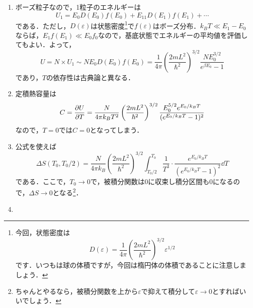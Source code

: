\documentclass[a4paper,pdflatex,ja=standard]{bxjsarticle}
\begin{document}
\begin{enumerate}
\begin{enumerate}
    \item 

    ボーズ粒子なので，1粒子のエネルギーは
    \begin{equation}
      U_1
      =
      E_0 D(E_0)f(E_0)
      +
      E_11 D(E_1)f(E_1)
      +
      \cdots
    \end{equation}
    である．ただし，$D(\varepsilon)$は状態密度\footnote{
      今回，状態密度は
      $$
        D(\varepsilon)
        =
        \frac{1}{4\pi}
        \left(  
          \frac{2mL^2}{\hbar^2}
        \right)^{3/2}
        \varepsilon^{1/2}
      $$
      です．いつもは球の体積ですが，今回は楕円体の体積であることに注意しましょう．
    }で$f(\varepsilon)$はボーズ分布．$k_BT\ll E_1-E_0$ならば，$E_1 f(E_1)\ll E_0 f_0$なので，基底状態でエネルギーの平均値を評価してもよい．よって，
    \begin{equation}
      U
      =
      N \times U_1
      \sim
      N E_0 D(E_0)f(E_0)
      =
      \frac{1}{4\pi}
      \left(  
        \frac{2mL^2}{\hbar^2}
      \right)^{3/2}
      \frac{NE_0^{3/2}}{e^{\beta E_0}-1}
    \end{equation}
    であり，$T$の依存性は古典論と異なる．

    \item 

    定積熱容量は
    \begin{equation}
      C
      =
      \pdv{U}{T}
      =
      \frac{N}{4\pi k_BT^2}
      \left(  
        \frac{2mL^2}{\hbar^2}
      \right)^{3/2}
      \frac{E_0^{5/2}e^{E_0/k_BT}}{(e^{E_0/k_BT}-1)^2}
    \end{equation}
    なので，$T=0$では$C=0$となってしまう．

    \item 
    
    公式を使えば
    \begin{equation}
      \Delta S(T_0, T_0/2)
      =
      \frac{N}{4\pi k_B}
      \left(  
        \frac{2mL^2}{\hbar^2}
      \right)^{3/2}
      \int_{T_0/2}^{T_0}
      \frac{1}{T^3}\cdot\frac{e^{E_0/k_BT}}{(e^{E_0/k_BT}-1)^2}
      \dd T
    \end{equation}
    である．ここで，$T_0\rightarrow 0$で，被積分関数は$0$に収束し積分区間も$0$になるので，$\Delta S\rightarrow 0$となる\footnote{
      ちゃんとやるなら，被積分関数を上から$\varepsilon$で抑えて積分して$\varepsilon\rightarrow 0$とすればいいでしょう．
    }．

    \item 


\end{enumerate}
\end{enumerate}
\end{document}

